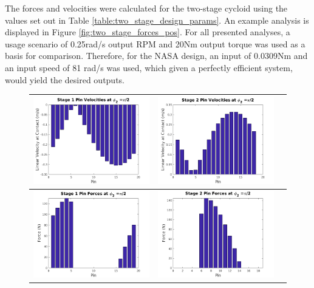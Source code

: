 The forces and velocities were calculated for the two-stage cycloid using the values set out in Table \ref{table:two_stage_design_params}. An example analysis is displayed in Figure \ref{fig:two_stage_forces_pos}. For all presented analyses, a usage scenario of 0.25rad/s output RPM and 20Nm output torque was used as a basis for comparison. Therefore, for the NASA design, an input of 0.0309Nm and an input speed of 81 rad/s was used, which given a perfectly efficient system, would yield the desired outputs. 

\begin{figure}[!t]
   \centering
   \begin{tabular}{ccc}
	   \includegraphics[width=0.50\columnwidth]{fig/double_1_vel_pi_2} &
	   \includegraphics[width=0.50\columnwidth]{fig/double_2_vel_pi_2} \\
	   \hline
	   \includegraphics[width=0.50\columnwidth]{fig/double_1_forces_pi_2} &
	   \includegraphics[width=0.50\columnwidth]{fig/double_2_forces_pi_2} \\

\end{tabular}
\end{figure}
